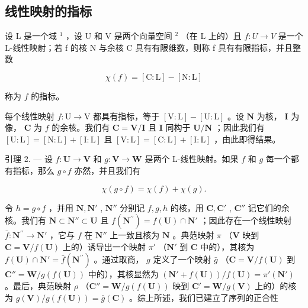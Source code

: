 \subsection{线性映射的指标}

设 L 是一个域 \(^{1}\) ，设 U 和 V 是两个向量空间 \(^{2}\) （在 L 上的）且 \(f: U \to V\) 是一个 L-线性映射；若 f 的核 N 与余核 C 具有有限维数，则称 f 具有有限指标，并且整数

\[
\chi (f) = [ \mathrm{C}: \mathrm{L} ] - [ \mathrm{N}: \mathrm{L} ]
\]

称为 \(f\) 的指标。

每个线性映射 \(f: \mathrm{U} \to \mathrm{V}\) 都具有指标，等于 \([\mathrm{V}: \mathrm{L}] - [\mathrm{U}: \mathrm{L}]\) 。设 \(\mathbf{N}\) 为核， \(\mathbf{I}\) 为像， \(\mathbf{C}\) 为 \(f\) 的余核。我们有 \(\mathbf{C} = \mathbf{V} / \mathbf{I}\) 且 \(\mathbf{I}\) 同构于 \(\mathbf{U} / \mathbf{N}\) ；因此我们有 \([\mathrm{U}: \mathrm{L}] = [\mathrm{N}: \mathrm{L}] + [\mathrm{I}: \mathrm{L}]\) 且 \([\mathrm{V}: \mathrm{L}] = [\mathrm{C}: \mathrm{L}] + [\mathrm{I}: \mathrm{L}]\) ，由此即得结果。

引理 2. --- 设 \(f: \mathbf{U} \to \mathbf{V}\) 和 \(g: \mathbf{V} \to \mathbf{W}\) 是两个 L-线性映射。如果 \(f\) 和 \(g\) 每一个都有指标，那么 \(g \circ f\) 亦然，并且我们有

\[
\chi (g \circ f) = \chi (f) + \chi (g).
\]

令 \(h = g \circ f\) ，并用 \(\mathbf{N}, \mathbf{N}'\) , \(\mathbf{N}''\) 分别记 \(f, g, h\) 的核，用 \(\mathbf{C}, \mathbf{C}'\) , \(\mathbf{C}''\) 记它们的余核。我们有 \(\mathbf{N} \subset \mathbf{N}'' \subset \mathbf{U}\) 且 \(f(\mathbf{N}^{\prime\prime}) = f(\mathbf{U}) \cap \mathbf{N}'\) ；因此存在一个线性映射 \(\bar{f}: \mathbf{N}^{\prime\prime} \to \mathbf{N}'\) ，它与 \(f\) 在 \(\mathbf{N}''\) 上一致且核为 \(\mathbf{N}\) 。典范映射 \(\pi\) （\(\mathbf{V}\) 映到 \(\mathbf{C} = \mathbf{V}/f(\mathbf{U})\) 上的）诱导出一个映射 \(\pi'\) （\(\mathbf{N}'\) 到 \(\mathbf{C}\) 中的），其核为 \(f(\mathbf{U}) \cap \mathbf{N}' = \bar{f}(\mathbf{N}^{\prime\prime})\) 。通过取商， \(g\) 定义了一个映射 \(\bar{g}\) （\(\mathbf{C} = \mathbf{V}/f(\mathbf{U})\) 到 \(\mathbf{C}'' = \mathbf{W}/g(f(\mathbf{U}))\) 中的），其核显然为 \((\mathbf{N}' + f(\mathbf{U}))/f(\mathbf{U}) = \pi'(\mathbf{N}')\) 。最后，典范映射 \(\rho\) （\(\mathbf{C}'' = \mathbf{W}/g(f(\mathbf{U}))\) 映到 \(\mathbf{C}' = \mathbf{W}/g(\mathbf{V})\) 上的）的核为 \(g(\mathbf{V})/g(f(\mathbf{U})) = \bar{g}(\mathbf{C})\) 。综上所述，我们已建立了序列的正合性

